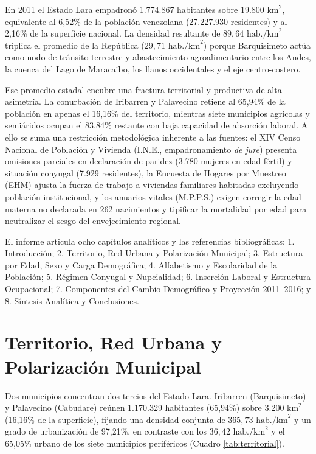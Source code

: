 \documentclass[12pt,letterpaper]{article}
\begin{document}
En 2011 el Estado Lara empadronó 1.774.867 habitantes sobre $19.800\text{ km}^2$, equivalente al 6,52\% de la población venezolana (27.227.930 residentes) y al 2,16\% de la superficie nacional. La densidad resultante de $89,64\text{ hab./km}^2$ triplica el promedio de la República ($29,71\text{ hab./km}^2$) porque Barquisimeto actúa como nodo de tránsito terrestre y abastecimiento agroalimentario entre los Andes, la cuenca del Lago de Maracaibo, los llanos occidentales y el eje centro-costero.

Ese promedio estadal encubre una fractura territorial y productiva de alta asimetría. La conurbación de Iribarren y Palavecino retiene al 65,94\% de la población en apenas el 16,16\% del territorio, mientras siete municipios agrícolas y semiáridos ocupan el 83,84\% restante con baja capacidad de absorción laboral. A ello se suma una restricción metodológica inherente a las fuentes: el XIV Censo Nacional de Población y Vivienda (I.N.E., empadronamiento \textit{de jure}) presenta omisiones parciales en declaración de paridez (3.780 mujeres en edad fértil) y situación conyugal (7.929 residentes), la Encuesta de Hogares por Muestreo (EHM) ajusta la fuerza de trabajo a viviendas familiares habitadas excluyendo población institucional, y los anuarios vitales (M.P.P.S.) exigen corregir la edad materna no declarada en 262 nacimientos y tipificar la mortalidad por edad para neutralizar el sesgo del envejecimiento regional.

El informe articula ocho capítulos analíticos y las referencias bibliográficas: 1. Introducción; 2. Territorio, Red Urbana y Polarización Municipal; 3. Estructura por Edad, Sexo y Carga Demográfica; 4. Alfabetismo y Escolaridad de la Población; 5. Régimen Conyugal y Nupcialidad; 6. Inserción Laboral y Estructura Ocupacional; 7. Componentes del Cambio Demográfico y Proyección 2011--2016; y 8. Síntesis Analítica y Conclusiones.

\section{Territorio, Red Urbana y Polarización Municipal}

Dos municipios concentran dos tercios del Estado Lara. Iribarren (Barquisimeto) y Palavecino (Cabudare) reúnen 1.170.329 habitantes (65,94\%) sobre $3.200\text{ km}^2$ (16,16\% de la superficie), fijando una densidad conjunta de $365,73\text{ hab./km}^2$ y un grado de urbanización de 97,21\%, en contraste con los $36,42\text{ hab./km}^2$ y el 65,05\% urbano de los siete municipios periféricos (Cuadro \ref{tab:territorial}).
\end{document}
